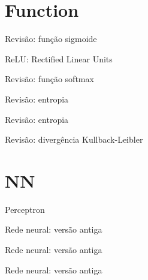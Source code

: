 \documentclass[10pt]{beamer}
\begin{document}
\nocite{DeepLearningbook}
\nocite{xiao2017/online}
\maketitle

\section{Function}

\begin{frame}[fragile]{Revisão: função sigmoide}

\end{frame}

\begin{frame}[fragile]{ReLU: Rectified Linear Units}

\end{frame}

\begin{frame}[fragile]{Revisão: função softmax}

\end{frame}

\begin{frame}{Revisão: entropia}

\end{frame}

\begin{frame}{Revisão: entropia}

\end{frame}

\begin{frame}{Revisão: divergência Kullback-Leibler}

\end{frame}


\section{NN}

\begin{frame}[fragile]{Perceptron}

\end{frame}

\begin{frame}[fragile]{Rede neural: versão antiga}

\end{frame}

\begin{frame}[fragile]{Rede neural: versão antiga}

\end{frame}

\begin{frame}[fragile]{Rede neural: versão antiga}
\begin{center}

\end{center}
\end{frame}
\end{document}

